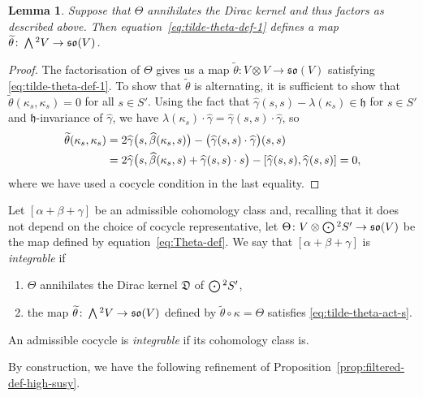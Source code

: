 \documentclass[11pt]{article}
\numberwithin{equation}{section}
\numberwithin{equation}{section}
\newtheorem{Lemma}[Theorem]{Lemma}
\newcommand{\fh}{\mathfrak{h}}
\newcommand{\fso}{\mathfrak{so}}
\newcommand{\fD}{\mathfrak{D}}
\newcommand{\betahat}{\widehat{\beta}}
\newcommand{\gammahat}{\widehat{\gamma}}
\newcommand{\thetatilde}{\widetilde{\theta}}
\newcommand{\Wedge}{\mathchoice{{\textstyle\bigwedge}}{\bigwedge}{\bigwedge}{\bigwedge}}	%
\newcommand{\Odot}{\mathchoice{{\textstyle\bigodot}}{\bigodot}{\bigodot}{\bigodot}}
\newcommand{\1}{\mathbbm{1}}
\begin{document}
\begin{Lemma}\label{lemma:theta-well-def}
	Suppose that $\Theta$ annihilates the Dirac kernel and thus factors as described above. Then equation~\eqref{eq:tilde-theta-def-1} defines a map $\thetatilde\colon\Wedge^2V\to \fso(V)$.
\end{Lemma}

\begin{proof}
	The factorisation of $\Theta$ gives us a map $\thetatilde\colon V\otimes V \to \fso(V)$ satisfying \eqref{eq:tilde-theta-def-1}. To show that $\thetatilde$ is alternating, it is sufficient to show that $\thetatilde(\kappa_s,\kappa_s)=0$ for all $s\in S'$. Using the fact that $\gammahat(s,s)-\lambda(\kappa_s)\in\fh$ for $s\in S'$ and $\fh$-invariance of $\gammahat$, we have $\lambda(\kappa_s)\cdot\gammahat = \gammahat(s,s)\cdot\gammahat$, so
	\begin{align*}
		\thetatilde(\kappa_s,\kappa_s)
		&= 2\gammahat\bigl(s,\betahat(\kappa_s,s)\bigr) - \bigl(\gammahat(s,s)\cdot\gammahat\bigr)(s,s)\\
		& = 2\gammahat\bigl(s,\betahat(\kappa_s,s) + \gammahat(s,s)\cdot s\bigr) - \comm{\gammahat(s,s)}{\gammahat(s,s)}
		= 0,
	\end{align*}
	where we have used a cocycle condition in the last equality.
\end{proof}

\begin{Definition}\label{def:integrable-cocycle}
	Let $[\alpha+\beta+\gamma]$ be an admissible cohomology class and, recalling that it does not depend on the choice of cocycle representative, let $\Theta\colon V\otimes\Odot^2S'\to\fso(V) $ be the map defined by equation~\eqref{eq:Theta-def}. We say that $[\alpha+\beta+\gamma]$ is \emph{integrable} if
	\begin{enumerate}\itemsep=0pt
	\item $\Theta$ annihilates the Dirac kernel $\fD$ of $\Odot^2S'$,
	\item the map $\thetatilde\colon\Wedge^2 V\to \fso(V)$ defined by $\thetatilde\circ\kappa=\Theta$ satisfies	\eqref{eq:tilde-theta-act-s}.
	\end{enumerate}
	An admissible cocycle is \emph{integrable} if its cohomology class is.
\end{Definition}

By construction, we have the following refinement of Proposition~\ref{prop:filtered-def-high-susy}.
\end{document}
